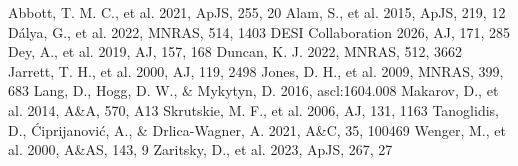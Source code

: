 \documentclass{aastex701}
\begin{document}

\begin{thebibliography}{}
 Abbott, T. M. C., et al. 2021, ApJS, 255, 20
 Alam, S., et al. 2015, ApJS, 219, 12
 D\'alya, G., et al. 2022, MNRAS, 514, 1403
 DESI Collaboration 2026, AJ, 171, 285
 Dey, A., et al. 2019, AJ, 157, 168
 Duncan, K. J. 2022, MNRAS, 512, 3662
 Jarrett, T. H., et al. 2000, AJ, 119, 2498
 Jones, D. H., et al. 2009, MNRAS, 399, 683
 Lang, D., Hogg, D. W., \& Mykytyn, D. 2016, ascl:1604.008
 Makarov, D., et al. 2014, A\&A, 570, A13
 Skrutskie, M. F., et al. 2006, AJ, 131, 1163
 Tanoglidis, D., \'Ciprijanovi\'c, A., \& Drlica-Wagner, A. 2021, A\&C, 35, 100469
 Wenger, M., et al. 2000, A\&AS, 143, 9
 Zaritsky, D., et al. 2023, ApJS, 267, 27
\end{thebibliography}
\end{document}

